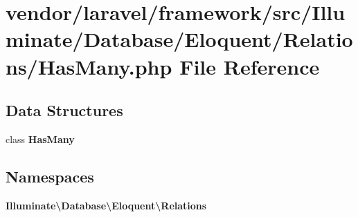 \section{vendor/laravel/framework/src/\+Illuminate/\+Database/\+Eloquent/\+Relations/\+Has\+Many.php File Reference}
\label{_has_many_8php}
\subsection*{Data Structures}
\begin{DoxyCompactItemize}
\item 
class {\bf Has\+Many}
\end{DoxyCompactItemize}
\subsection*{Namespaces}
\begin{DoxyCompactItemize}
\item 
 {\bf Illuminate\textbackslash{}\+Database\textbackslash{}\+Eloquent\textbackslash{}\+Relations}
\end{DoxyCompactItemize}
